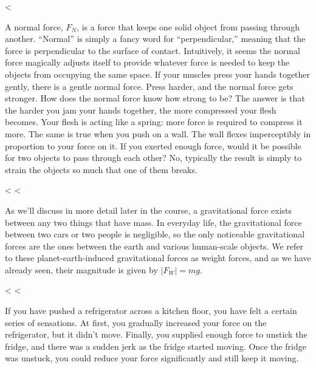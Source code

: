 \enlargethispage{-\baselineskip}

<%

A normal force, $F_N$, is a force that keeps one solid
object from passing through another. ``Normal'' is simply a
fancy word for ``perpendicular,'' meaning that the force is
perpendicular to the surface of contact. Intuitively, it
seems the normal force magically adjusts itself to provide
whatever force is needed to keep the objects from occupying
the same space. If your muscles press your hands together
gently, there is a gentle normal force. Press harder, and
the normal force gets stronger. How does the normal force
know how strong to be? The answer is that the harder you jam
your hands together, the more compressed your flesh becomes.
Your flesh is acting like a spring: more force is required
to compress it more. The same is true when you push on a
wall. The wall flexes imperceptibly in proportion to your
force on it. If you exerted enough force, would it be
possible for two objects to pass through each other? No,
typically the result is simply to strain the objects so much
that one of them breaks.

<%
<%

As we'll discuss in more detail later in the course, a
gravitational force exists between any two things that have
mass. In everyday life, the gravitational force between two
cars or two people is negligible, so the only noticeable
gravitational forces are the ones between the earth and
various human-scale objects. We refer to these planet-earth-induced
gravitational forces as weight forces, and as we have
already seen, their magnitude is given by $|F_W|=mg$.


<%
<%

If you have pushed a refrigerator across a kitchen floor,
you have felt a certain series of sensations. At first, you
gradually increased your force on the refrigerator, but it
didn't move. Finally, you supplied enough force to unstick
the fridge, and there was a sudden jerk as the fridge
started moving. Once the fridge was unstuck, you could reduce
your force significantly and still keep it moving.

